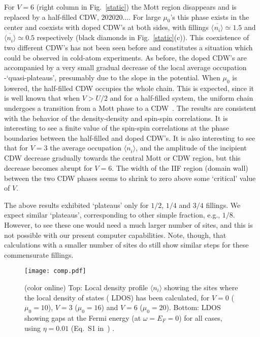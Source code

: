 \documentclass[aps,prl,showpacs,twocolumn,superscriptaddress]{revtex4-2}
\begin{document}
For $V= 6$ (right column in Fig.~\ref{static})  the Mott region disappears and is replaced by a half-filled CDW, $202020\dots$. For large $\mu^{}_0$'s this phase exists in the center and coexists with doped CDW's at both sides, with fillings $\overline{\langle ^{}n_i\rangle} \simeq 1.5$ and $\overline{\langle n^{}_i\rangle} \simeq 0.5$ respectively (black diamonds in Fig.~\ref{static}(c)). This coexistence of two different CDW's has not been seen before and constitutes a situation which could be observed in cold-atom experiments.  As before, the doped CDW's are accompanied by a very small gradual decrease of the local average occupation -`quasi-plateaus', presumably due to the slope in the potential. When $\mu^{}_0$ is lowered, the half-filled CDW occupies the whole chain. This is expected, since it is well known that when $V>U/2$ and for a half-filled system, the uniform chain undergoes a transition from a Mott phase to a CDW~\cite{Glocke,nakamura}. The results are consistent with the behavior of the density-density and spin-spin correlations. It is interesting to see a finite value of the spin-spin correlations at the phase boundaries between the half-filled and doped CDW's. It is also interesting to see that for $V=3$ the average occupation $\overline{\langle n^{}_i\rangle}$, and the amplitude of the incipient CDW decrease gradually towards the central Mott or CDW region, but this decrease becomes abrupt for $V=6$.
The width of the IIF  region (domain wall) between the two CDW phases seems to shrink to zero above some `critical' value of $V$.

The above results exhibited `plateaus' only for $1/2$, $1/4$ and $3/4$ fillings. We expect similar `plateaus', corresponding to other simple fraction, e.g., $1/8$. However, to see these one would need a much larger number of sites, and this is not possible with our present computer capabilities. Note, though,  that calculations with a smaller number of sites do still show similar steps  for these commensurate fillings.




\begin{figure}[h]
\centering
 \texttt{[image: comp.pdf]}
\caption{(color online) { Top: Local density profile $\langle n_i\rangle$ showing the sites where the local density of states ( LDOS) has been calculated, for $V=0$
($ \mu^{}_0=10$), $V=3$ ($ \mu^{}_0=16$) and $V=6$ ($ \mu^{}_0=20$). Bottom: LDOS showing gaps at the Fermi energy (at $\omega=E^{}_F=0$) for all cases, using $\eta=0.01$ (Eq.~S1 in~\cite{SM}) .
}
}
\label{compress}
\end{figure}
\end{document}

